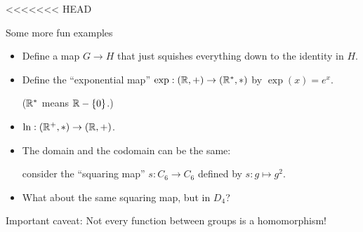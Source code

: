 \documentclass[8pt, handout]{beamer}
\begin{document}
<<<<<<< HEAD

\begin{frame}{Some more fun examples}
  \begin{itemize}
    \item Define a map $G\to H$ that just squishes everything down to the identity in $H$. \pause
    \item Define the ``exponential map'' $\exp: (\mathbb{R}, +) \to (\mathbb{R}^*, \ast)$ by $\exp(x) = e^x$. 
    
    ($\mathbb{R}^*$ means $\mathbb{R} - \{0\}$.)
    \pause
    \item $\ln: (\mathbb{R}^+, \ast) \to (\mathbb{R}, +)$. \pause
    \item The domain and the codomain can be the same:

    consider the ``squaring map'' $s: C_6 \to C_6$ defined by $s: g \mapsto g^2$. \pause

    \item What about the same squaring map, but in $D_4$? \pause
  \end{itemize}
  \begin{alertblock}{Important caveat:}
    Not every function between groups is a homomorphism!
  \end{alertblock}
\end{frame}

\end{document}
